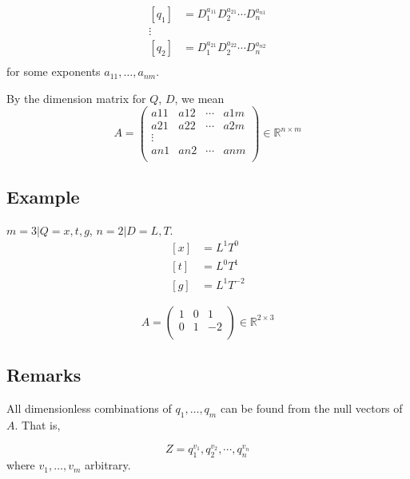 \documentclass[12pt]{article}
\begin{document}
\begin{equation}
  \begin{aligned}
    [q_1] &= D_1^{a_{11}} D_2^{a_{21}}\cdots D_n^{a_{n1}} \\
    \vdots & \\
    [q_2] &= D_1^{a_{21}} D_2^{a_{22}}\cdots D_n^{a_{n2}} \\
  \end{aligned}
\end{equation}
for some exponents $a_{11}, \ldots, a_{nm}$.

By the dimension matrix for $Q$, $D$, we mean
\begin{equation}
  A =
  \begin{pmatrix}
    a11 & a12 & \cdots & a1m \\
    a21 & a22 & \cdots & a2m \\
    \vdots & & & \\
    an1 & an2 & \cdots & anm \\
  \end{pmatrix}
  \in \mathbb{R}^{n\times m}
\end{equation}

\subsection{Example}
$m = 3 | Q = {x, t, g}$, $n = 2 | D = {L, T}$.
\begin{equation}
  \begin{aligned}
    [x] &= L^1 T^0 \\
    [t] &= L^0 T^1 \\
    [g] &= L^1 T^{-2}
  \end{aligned}
\end{equation}

\begin{equation}
  A =
  \begin{pmatrix}
    1 & 0 & 1 \\
    0 & 1 & -2 \\
  \end{pmatrix}
  \in \mathbb{R}^{2\times3}
\end{equation}

\subsection{Remarks}
All dimensionless combinations of $q_1,\ldots,q_m$ can be found from the null
vectors of $A$. That is,

$$Z = q_1^{v_1}, q_2^{v_2}, \cdots, q_n^{v_n}$$ where $v_1, \ldots, v_m$
arbitrary.
\end{document}
